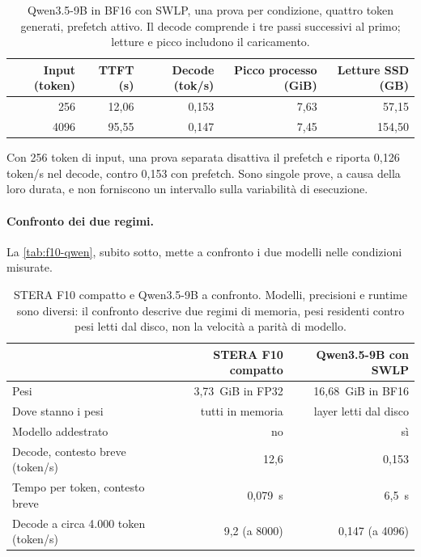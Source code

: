 \begin{table}[H]
\centering
\small
\begin{tabular}{rrrrr}
\toprule
Input (token) & TTFT (s) & Decode (tok/s) & Picco processo (GiB) & Letture SSD (GB) \\
\midrule
256 & 12,06 & 0,153 & 7,63 & 57,15 \\
\num{4096} & 95,55 & 0,147 & 7,45 & 154,50 \\
\bottomrule
\end{tabular}
\caption{Qwen3.5-9B in BF16 con SWLP, una prova per condizione, quattro token generati, prefetch attivo. Il decode comprende i tre passi successivi al primo; letture e picco includono il caricamento.}
\label{tab:qwen-swlp}
\end{table}

Con 256 token di input, una prova separata disattiva il prefetch e riporta 0,126 token/s nel decode, contro 0,153 con prefetch. Sono singole prove, a causa della loro durata, e non forniscono un intervallo sulla variabilità di esecuzione.

\paragraph{Confronto dei due regimi.} La \autoref{tab:f10-qwen}, subito sotto, mette a confronto i due modelli nelle condizioni misurate.

\begin{table}[H]
\centering
\small
\begin{tabular}{lrr}
\toprule
& STERA F10 compatto & Qwen3.5-9B con SWLP \\
\midrule
Pesi & 3,73~GiB in FP32 & 16,68~GiB in BF16 \\
Dove stanno i pesi & tutti in memoria & layer letti dal disco \\
Modello addestrato & no & sì \\
Decode, contesto breve (token/s) & 12,6 & 0,153 \\
Tempo per token, contesto breve & 0,079~s & 6,5~s \\
Decode a circa 4.000 token (token/s) & 9,2 (a \num{8000}) & 0,147 (a \num{4096}) \\
\bottomrule
\end{tabular}
\caption{STERA F10 compatto e Qwen3.5-9B a confronto. Modelli, precisioni e runtime sono diversi: il confronto descrive due regimi di memoria, pesi residenti contro pesi letti dal disco, non la velocità a parità di modello.}
\label{tab:f10-qwen}
\end{table}

